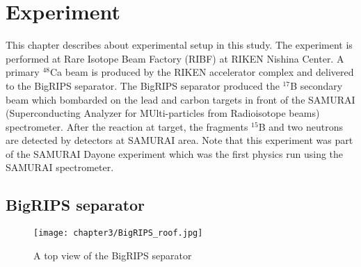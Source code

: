 \chapter{Experiment}
    This chapter describes about experimental setup in this study. The experiment is performed at Rare Isotope Beam Factory (RIBF) at RIKEN Nishina Center.\cite{RIKEN} A primary ${}^{48}$Ca beam is produced by the RIKEN accelerator complex and delivered to the BigRIPS separator. \cite{Kubo03} \cite{Kubo07} \cite{Kubo12} The BigRIPS separator produced the ${}^{17}$B secondary beam which bombarded on the lead and carbon targets in front of the SAMURAI (Superconducting Analyzer for MUlti-particles from Radioisotope beams) spectrometer. \cite{SAMURAI} After the reaction at target, the fragments ${}^{15}$B and two neutrons are detected by detectors at SAMURAI area. Note that this experiment was part of the SAMURAI Dayone experiment which was the first physics run using the SAMURAI spectrometer.

\section{BigRIPS separator}

    \begin{figure}
        \centering
        \texttt{[image: chapter3/BigRIPS\_roof.jpg]}
        \caption{A top view of the BigRIPS separator}
    \end{figure} 

